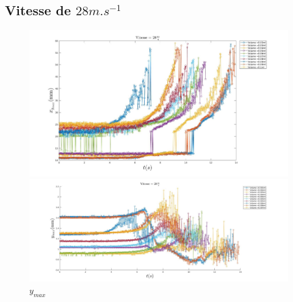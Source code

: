 \subsection{Vitesse de $28m.s^{-1}$}

\begin{figure}[!h]
	\centering
	\begin{minipage}{0.95\linewidth}
	\includegraphics[width = \linewidth]{./image/v=28xm.jpg}
	\caption{$x_{max}$}
	\end{minipage}
	\begin{minipage}{0.95\linewidth}
	\includegraphics[width = \linewidth]{./image/v=28ym.jpg}
	\caption{$y_{max}$}
	\end{minipage}
\end{figure}
